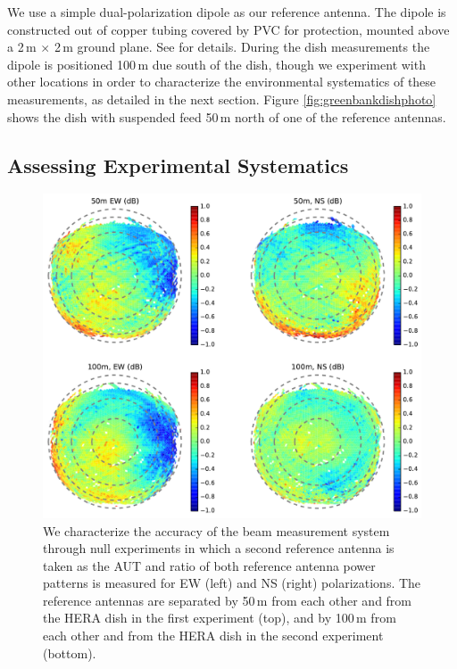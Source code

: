\documentclass{emulateapj}
\begin{document}
We use a simple dual-polarization dipole as our reference antenna. The dipole is constructed out of copper tubing covered by PVC for protection, mounted above a 2\,m $\times$ 2\,m ground plane. See \citet{neben15} for details. During the dish measurements the dipole is positioned 100\,m due south of the dish, though we experiment with other locations in order to characterize the environmental systematics of these measurements, as detailed in the next section. Figure \ref{fig:greenbankdishphoto} shows the dish with suspended feed 50\,m north of one of the reference antennas.

\subsection{Assessing Experimental Systematics}

\begin{figure}[h]
\centering
\includegraphics[width=6.5in]{null_expt_rel_beam_maps.pdf}
\caption{We characterize the accuracy of the beam measurement system through null experiments in which a second reference antenna is taken as the AUT and ratio of both reference antenna power patterns is measured for EW (left) and NS (right) polarizations. The reference antennas are separated by 50\,m from each other and from the HERA dish in the first experiment (top), and by 100\,m from each other and from the HERA dish in the second experiment (bottom).}
\label{fig:nullexptplots}
\end{figure}
\end{document}
